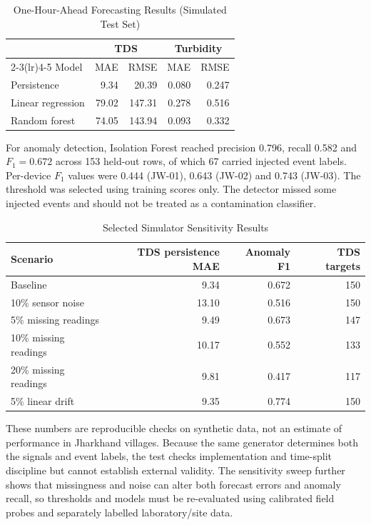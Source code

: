 \documentclass[10pt,letterpaper,twocolumn]{article}
\begin{document}
\begin{table}[t]
\caption{One-Hour-Ahead Forecasting Results (Simulated Test Set)}
\centering\footnotesize
\begin{tabular}{@{}lrrrr@{}}
\toprule
 & \multicolumn{2}{c}{TDS} & \multicolumn{2}{c}{Turbidity}\\
\cmidrule(lr){2-3}\cmidrule(lr){4-5}
Model & MAE & RMSE & MAE & RMSE\\
\midrule
Persistence & 9.34 & 20.39 & 0.080 & 0.247\\
Linear regression & 79.02 & 147.31 & 0.278 & 0.516\\
Random forest & 74.05 & 143.94 & 0.093 & 0.332\\
\bottomrule
\end{tabular}
\end{table}

For anomaly detection, Isolation Forest reached precision 0.796, recall 0.582 and $F_1=0.672$ across 153 held-out rows, of which 67 carried injected event labels. Per-device $F_1$ values were 0.444 (JW-01), 0.643 (JW-02) and 0.743 (JW-03). The threshold was selected using training scores only. The detector missed some injected events and should not be treated as a contamination classifier.

\begin{table}[t]
\caption{Selected Simulator Sensitivity Results}
\centering\footnotesize
\begin{tabular}{@{}lrrr@{}}
\toprule
Scenario & TDS persistence MAE & Anomaly F1 & TDS targets\\
\midrule
Baseline & 9.34 & 0.672 & 150\\
10\% sensor noise & 13.10 & 0.516 & 150\\
5\% missing readings & 9.49 & 0.673 & 147\\
10\% missing readings & 10.17 & 0.552 & 133\\
20\% missing readings & 9.81 & 0.417 & 117\\
5\% linear drift & 9.35 & 0.774 & 150\\
\bottomrule
\end{tabular}
\end{table}

These numbers are reproducible checks on synthetic data, not an estimate of performance in Jharkhand villages. Because the same generator determines both the signals and event labels, the test checks implementation and time-split discipline but cannot establish external validity. The sensitivity sweep further shows that missingness and noise can alter both forecast errors and anomaly recall, so thresholds and models must be re-evaluated using calibrated field probes and separately labelled laboratory/site data.
\end{document}
